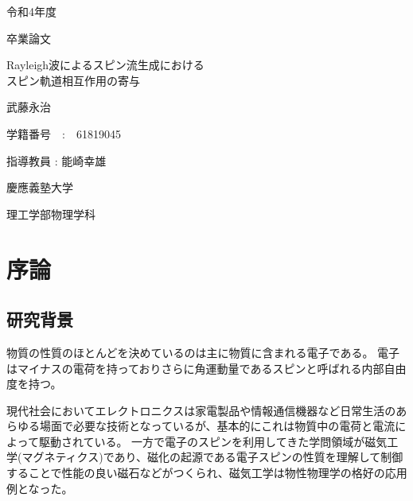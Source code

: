 \documentclass[dvipdfmx]{jsreport}
\numberwithin{equation}{chapter}
\numberwithin{table}{chapter}
\begin{document}
\begin{titlepage}
	\begin{center}
		
		{\large 令和4年度}
		
		\vspace{10truept}
		
		{\large 卒業論文}
		
		\vspace*{100truept}
		
		{\huge Rayleigh波によるスピン流生成における\\スピン軌道相互作用の寄与} 
		
		\vspace{80truept}
		
		{\LARGE 武藤永治}
		
		\vspace{5truept}
		
		{\Large 学籍番号　:　61819045}
		
		\vspace{70truept}
		
		{\Large 指導教員 : 能崎幸雄}
		
		\vspace{70truept}
		
		{\Large 慶應義塾大学}
		
		\vspace{10truept}
		
		{\Large 理工学部物理学科}
		
    
		
	\end{center}
\end{titlepage}

\setcounter{tocdepth}{3}
\tableofcontents
\clearpage

\chapter{序論}
\section{研究背景}
物質の性質のほとんどを決めているのは主に物質に含まれる電子である。
電子はマイナスの電荷を持っておりさらに角運動量であるスピンと呼ばれる内部自由度を持つ。

現代社会においてエレクトロニクスは家電製品や情報通信機器など日常生活のあらゆる場面で必要な技術となっているが、基本的にこれは物質中の電荷と電流によって駆動されている。
一方で電子のスピンを利用してきた学問領域が磁気工学(マグネティクス)であり、磁化の起源である電子スピンの性質を理解して制御することで性能の良い磁石などがつくられ、磁気工学は物性物理学の格好の応用例となった。
\end{document}
